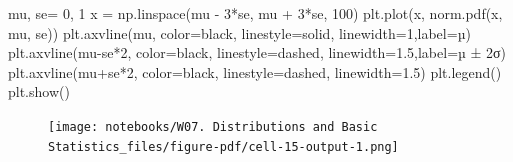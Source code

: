 \documentclass[
  letterpaper,
  DIV=11,
  numbers=noendperiod]{scrreprt}
\newenvironment{Shaded}{\begin{snugshade}}{\end{snugshade}}
\newcommand{\DecValTok}[1]{\textcolor[rgb]{0.68,0.00,0.00}{#1}}
\newcommand{\FloatTok}[1]{\textcolor[rgb]{0.68,0.00,0.00}{#1}}
\newcommand{\NormalTok}[1]{\textcolor[rgb]{0.00,0.23,0.31}{#1}}
\newcommand{\OperatorTok}[1]{\textcolor[rgb]{0.37,0.37,0.37}{#1}}
\newcommand{\StringTok}[1]{\textcolor[rgb]{0.13,0.47,0.30}{#1}}
\begin{document}
\begin{Shaded}
\begin{Highlighting}[]
\NormalTok{mu, se}\OperatorTok{=} \DecValTok{0}\NormalTok{, }\DecValTok{1}
\NormalTok{x }\OperatorTok{=}\NormalTok{ np.linspace(mu }\OperatorTok{{-}} \DecValTok{3}\OperatorTok{*}\NormalTok{se, mu }\OperatorTok{+} \DecValTok{3}\OperatorTok{*}\NormalTok{se, }\DecValTok{100}\NormalTok{)}
\NormalTok{plt.plot(x, norm.pdf(x, mu, se))}
\NormalTok{plt.axvline(mu, color}\OperatorTok{=}\StringTok{\textquotesingle{}black\textquotesingle{}}\NormalTok{, linestyle}\OperatorTok{=}\StringTok{\textquotesingle{}solid\textquotesingle{}}\NormalTok{, linewidth}\OperatorTok{=}\DecValTok{1}\NormalTok{,label}\OperatorTok{=}\StringTok{\textquotesingle{}µ\textquotesingle{}}\NormalTok{)}
\NormalTok{plt.axvline(mu}\OperatorTok{{-}}\NormalTok{se}\OperatorTok{*}\DecValTok{2}\NormalTok{, color}\OperatorTok{=}\StringTok{\textquotesingle{}black\textquotesingle{}}\NormalTok{, linestyle}\OperatorTok{=}\StringTok{\textquotesingle{}dashed\textquotesingle{}}\NormalTok{, linewidth}\OperatorTok{=}\FloatTok{1.5}\NormalTok{,label}\OperatorTok{=}\StringTok{\textquotesingle{}µ ± 2σ\textquotesingle{}}\NormalTok{)}
\NormalTok{plt.axvline(mu}\OperatorTok{+}\NormalTok{se}\OperatorTok{*}\DecValTok{2}\NormalTok{, color}\OperatorTok{=}\StringTok{\textquotesingle{}black\textquotesingle{}}\NormalTok{, linestyle}\OperatorTok{=}\StringTok{\textquotesingle{}dashed\textquotesingle{}}\NormalTok{, linewidth}\OperatorTok{=}\FloatTok{1.5}\NormalTok{)}
\NormalTok{plt.legend()}
\NormalTok{plt.show()}
\end{Highlighting}
\end{Shaded}

\begin{figure}[H]

{\centering \texttt{[image: notebooks/W07. Distributions and Basic Statistics\_files/figure-pdf/cell-15-output-1.png]}

}

\end{figure}
\end{document}
